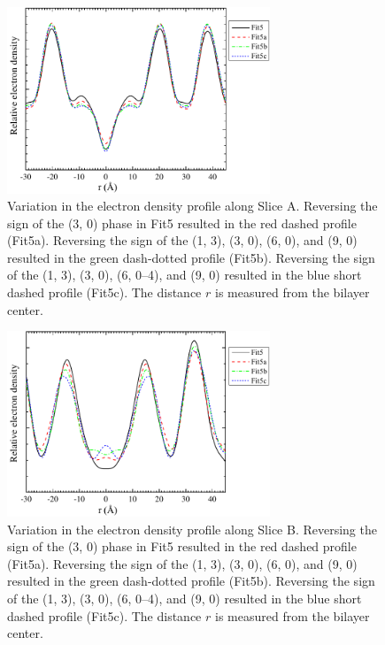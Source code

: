 \begin{figure}[htbp]
  \centering
  \includegraphics[width=0.7\textwidth]{figures/ripple/LAXS/major_phase_variation}
  \caption{Variation in the electron density profile along Slice A. 
  Reversing the sign of the (3, 0) phase in Fit5 
  resulted in the red dashed profile (Fit5a). Reversing the sign of the 
  (1, 3), (3, 0), (6, 0), and (9, 0) resulted in the green dash-dotted profile
  (Fit5b). Reversing the sign of the (1, 3), (3, 0), (6, 0--4), and (9, 0)
  resulted in the blue short dashed profile (Fit5c). 
  The distance $r$ is measured from the bilayer center.}
  \label{fig:major_phase_variation}
\end{figure}

\begin{figure}[htbp]
  \centering
  \includegraphics[width=0.7\textwidth]{figures/ripple/LAXS/minor_phase_variation}
  \caption{Variation in the electron density profile along Slice B.
  Reversing the sign of the (3, 0) phase in Fit5 
  resulted in the red dashed profile (Fit5a). Reversing the sign of the 
  (1, 3), (3, 0), (6, 0), and (9, 0) resulted in the green dash-dotted profile
  (Fit5b). Reversing the sign of the (1, 3), (3, 0), (6, 0--4), and (9, 0)
  resulted in the blue short dashed profile (Fit5c). 
  The distance $r$ is measured from the bilayer center.}
  \label{fig:minor_phase_variation}
\end{figure}

